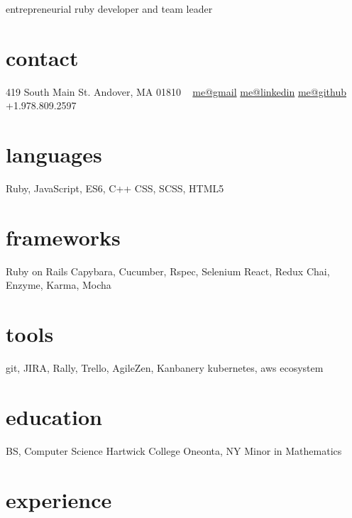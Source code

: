\documentclass[print]{friggeri-cv}
\begin{document}
       {entrepreneurial ruby developer and team leader}
       
\begin{aside}
  \section{contact}
    419 South Main St.
    Andover, MA 01810
    ~
    \href{mailto:wcdesmarais+resume@gmail.com}{me@gmail}
    \href{https://www.linkedin.com/in/billdesmarais}{me@linkedin}
    \href{https://github.com/bosoxbill}{me@github}
    ~
    +1.978.809.2597
  \section{languages}
    Ruby, JavaScript, 
    ES6, C++
    CSS, SCSS, HTML5
  \section{frameworks}
    Ruby on Rails
    Capybara, Cucumber, Rspec, Selenium
    React, Redux
    Chai, Enzyme, Karma, Mocha
  \section{tools}
    git, JIRA, Rally, Trello,
    AgileZen, Kanbanery
    kubernetes,
    aws ecosystem
  \section{education}
    BS, Computer Science
    Hartwick College
    Oneonta, NY
    Minor in Mathematics
\end{aside}

\section{experience}
\end{document}
